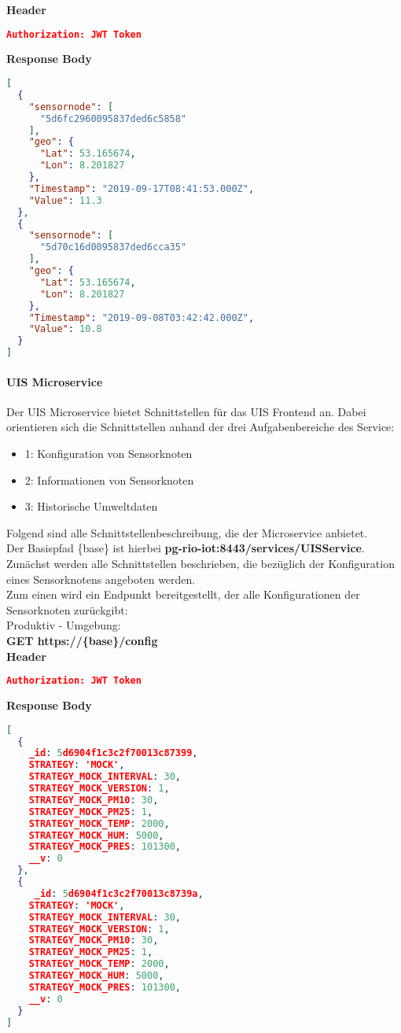 \textbf{Header}
\begin{lstlisting}[language=json,firstnumber=1,basicstyle=\footnotesize]
Authorization: JWT Token
\end{lstlisting}
\textbf{Response Body}
\begin{lstlisting}[language=json,firstnumber=1,basicstyle=\footnotesize]
[
  {
    "sensornode": [
      "5d6fc2960095837ded6c5858"
    ],
    "geo": {
      "Lat": 53.165674,
      "Lon": 8.201827
    },
    "Timestamp": "2019-09-17T08:41:53.000Z",
    "Value": 11.3
  },
  {
    "sensornode": [
      "5d70c16d0095837ded6cca35"
    ],
    "geo": {
      "Lat": 53.165674,
      "Lon": 8.201827
    },
    "Timestamp": "2019-09-08T03:42:42.000Z",
    "Value": 10.8
  }
]
\end{lstlisting}

\paragraph{UIS Microservice}
Der UIS Microservice bietet Schnittstellen für das UIS Frontend an.
Dabei orientieren sich die Schnittstellen anhand der drei Aufgabenbereiche des Service: 
\begin{itemize}
	\item {1: Konfiguration von Sensorknoten}
	\item {2: Informationen von Sensorknoten}
	\item {3: Historische Umweltdaten}
\end{itemize}
Folgend sind alle Schnittstellenbeschreibung, die der Microservice anbietet.
\\
Der Basispfad \{base\} ist hierbei \textbf{pg-rio-iot:8443/services/UISService}.
\newline
Zunächst werden alle Schnittstellen beschrieben, die bezüglich der Konfiguration eines Sensorknotens angeboten werden.
\\
Zum einen wird ein Endpunkt bereitgestellt, der alle Konfigurationen der Sensorknoten zurückgibt:
\\
Produktiv - Umgebung:
\\
\textbf{GET https://\{base\}/config}
\\
\textbf{Header}
\begin{lstlisting}[language=json,firstnumber=1,basicstyle=\footnotesize]
Authorization: JWT Token
\end{lstlisting}
\textbf{Response Body}
\begin{lstlisting}[language=json,firstnumber=1,basicstyle=\footnotesize]
[
  { 
    _id: 5d6904f1c3c2f70013c87399,
    STRATEGY: 'MOCK',
    STRATEGY_MOCK_INTERVAL: 30,
    STRATEGY_MOCK_VERSION: 1,
    STRATEGY_MOCK_PM10: 30,
    STRATEGY_MOCK_PM25: 1,
    STRATEGY_MOCK_TEMP: 2000,
    STRATEGY_MOCK_HUM: 5000,
    STRATEGY_MOCK_PRES: 101300,
    __v: 0
  },
  {
     _id: 5d6904f1c3c2f70013c8739a,
    STRATEGY: 'MOCK',
    STRATEGY_MOCK_INTERVAL: 30,
    STRATEGY_MOCK_VERSION: 1,
    STRATEGY_MOCK_PM10: 30,
    STRATEGY_MOCK_PM25: 1,
    STRATEGY_MOCK_TEMP: 2000,
    STRATEGY_MOCK_HUM: 5000,
    STRATEGY_MOCK_PRES: 101300,
    __v: 0
  }
]
\end{lstlisting}
